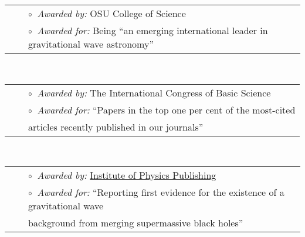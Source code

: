 \begin{tabular}{rcl}
&\hspace{0.4cm} &{\color{color1} $\circ\;\;$}\emph{Awarded by:} OSU College of Science \\
&\hspace{0.4cm} &{\color{color1} $\circ\;\;$}\emph{Awarded for:} Being ``an emerging international leader in gravitational wave astronomy''\\
\end{tabular} \\

\begin{tabular}{rcl}
&\hspace{0.4cm} &{\color{color1} $\circ\;\;$}\emph{Awarded by:} The International Congress of Basic Science \\
&\hspace{0.4cm} &{\color{color1} $\circ\;\;$}\emph{Awarded for:} ``Papers in the top one per cent of the most-cited\\
&\hspace{0.4cm} &\hspace{2.7cm} articles recently published in our journals''\\
\end{tabular} \\

\begin{tabular}{rcl}
&\hspace{0.4cm} &{\color{color1} $\circ\;\;$}\emph{Awarded by:} \href{https://ioppublishing.org/north-america-top-cited-paper-award/}{Institute of Physics Publishing} \\
&\hspace{0.4cm} &{\color{color1} $\circ\;\;$}\emph{Awarded for:} ``Reporting first evidence for the existence of a 
gravitational wave\\
&\hspace{0.4cm} & \hspace{2.7cm} background from merging supermassive black holes''\\
\end{tabular} \\

